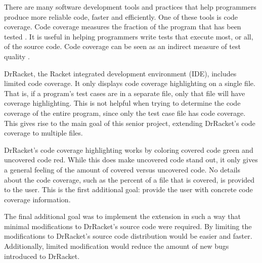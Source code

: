 There are many software development tools and practices that help programmers produce more reliable code, faster and efficiently. One of these tools is code coverage. Code coverage measures the fraction of the program that has been tested \cite{lasse}. It is useful in helping programmers write tests that execute most, or all, of the source code. Code coverage can be seen as an indirect measure of test quality \cite{lasse}.

DrRacket, the Racket integrated development environment (IDE), includes limited code coverage. It only displays code coverage highlighting on a single file. That is, if a program's test cases are in a separate file, only that file will have coverage highlighting. This is not helpful when trying to determine the code coverage of the entire program, since only the test case file has code coverage. This gives rise to the main goal of this senior project, extending DrRacket's code coverage to multiple files. 

DrRacket's code coverage highlighting works by coloring covered code green and uncovered code red. While this does make uncovered code stand out, it only gives a general feeling of the amount of covered versus uncovered code. No details about the code coverage, such as the percent of a file that is covered, is provided to the user. This is the first additional goal: provide the user with concrete code coverage information.

The final additional goal was to implement the extension in such a way that minimal modifications to DrRacket's source code were required. By limiting the modifications to DrRacket's source code distribution would be easier and faster. Additionally, limited modification would reduce the amount of new bugs introduced to DrRacket.